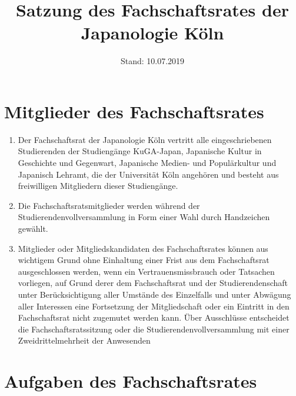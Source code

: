 \documentclass[12pt]{scrartcl}
\title{Satzung des Fachschaftsrates der Japanologie Köln}
\date{Stand: 10.07.2019}
\begin{document}
\maketitle

\section{Mitglieder des Fachschaftsrates}

\begin{enumerate}
	\item Der Fachschaftsrat der Japanologie Köln vertritt alle eingeschriebenen Studierenden der Studiengänge KuGA-Japan, Japanische Kultur in Geschichte und Gegenwart, Japanische Medien- und Populärkultur und Japanisch Lehramt, die der Universität Köln angehören und besteht aus freiwilligen Mitgliedern dieser Studiengänge.
	\item Die Fachschaftsratsmitglieder werden während der Studierendenvollversammlung in Form einer Wahl durch Handzeichen gewählt.
	\item Mitglieder oder Mitgliedskandidaten des Fachschaftsrates können aus wichtigem Grund ohne Einhaltung einer Frist aus dem Fachschaftsrat ausgeschlossen werden, wenn ein Vertrauensmissbrauch oder Tatsachen vorliegen, auf Grund derer dem Fachschaftsrat und der Studierendenschaft unter Berücksichtigung aller Umstände des Einzelfalls und unter Abwägung aller Interessen eine Fortsetzung der Mitgliedschaft oder ein Eintritt in den Fachschaftsrat nicht zugemutet werden kann. Über Ausschlüsse entscheidet die Fachschaftsratssitzung oder die Studierendenvollversammlung mit einer Zweidrittelmehrheit der Anwesenden
\end{enumerate}

\section{Aufgaben des Fachschaftsrates}
\label{sec:aufgaben}
\end{document}
